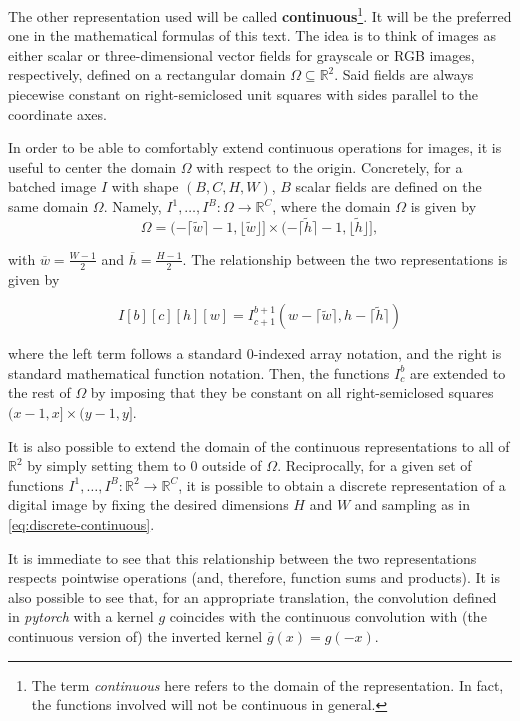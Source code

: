 \documentclass[twocolumn,twoside,a4paper,10pt]{IEEEtran}
\begin{document}
The other representation used will be called \textbf{continuous}\footnote{The term \textit{continuous} here refers to the domain of the representation. In fact, the functions involved will not be continuous in general.}. It will be the preferred one in the mathematical formulas of this text. The idea is to think of images as either scalar or three-dimensional vector fields for grayscale or RGB images, respectively, defined on a rectangular domain \(\Omega\subseteq \mathbb{R}^2\). Said fields are always piecewise constant on right-semiclosed unit squares with sides parallel to the coordinate axes.

In order to be able to comfortably extend continuous operations for images, it is useful to center the domain \(\Omega\) with respect to the origin. Concretely, for a batched image \(I\) with shape \((B, C, H, W)\), \(B\)  scalar fields are defined on the same domain \(\Omega\). Namely, \(I^1, \dots, I^B\colon\Omega\to \mathbb{R}^C\), where the domain \(\Omega\) is given by
\[
  \Omega = (-\lceil \tilde{w}\rceil - 1, \lfloor \tilde{w}\rfloor]\times(-\lceil \tilde{h}\rceil -1, \lfloor \tilde{h}\rfloor]
,\]

with \(\overline{w}=\frac{W-1}{2}\) and \(\overline{h}=\frac{H-1}{2}\). The relationship between the two representations is given by

\begin{equation}\label{eq:discrete-continuous}
  I[b][c][h][w] = I^{b+1}_{c+1}(w - \lceil\tilde{w}\rceil, h - \lceil\tilde{h}\rceil)
\end{equation}

where the left term follows a standard \(0\)-indexed array notation, and the right is standard mathematical function notation. Then, the functions \(I^b_c\) are extended to the rest of \(\Omega\) by imposing that they be constant on all right-semiclosed squares \((x-1,x]\times(y-1, y]\).

It is also possible to extend the domain of the continuous representations to all of \(\mathbb{R}^2\) by simply setting them to \(0\) outside of \(\Omega\). Reciprocally, for a given set of functions \(I^1, \dots, I^B\colon \mathbb{R}^2\to \mathbb{R}^C\), it is possible to obtain a discrete representation of a digital image by fixing the desired dimensions \(H\) and \(W\) and sampling as in \cref{eq:discrete-continuous}.

It is immediate to see that this relationship between the two representations respects pointwise operations (and, therefore, function sums and products). It is also possible to see that, for an appropriate translation, the convolution defined in \textit{pytorch} with a kernel \(g\) coincides with the continuous convolution with (the continuous version of) the inverted kernel \(\overline{g}(x) = g(-x)\).
\end{document}
